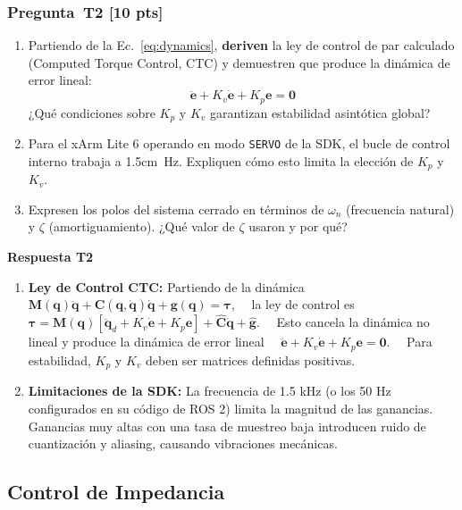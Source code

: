 \documentclass[journal,10pt,twoside]{IEEEtran}
\newcommand{\answerline}[1][3cm]{\underline{\hspace{#1}}}
\newcommand{\pts}[1]{\textbf{\color{tec_red}[#1 pts]}}
\begin{document}
\subsubsection*{Pregunta~T2 \pts{10}}
\begin{enumerate}[label=(\alph*)]
  \item Partiendo de la Ec.~\eqref{eq:dynamics}, \textbf{deriven} la
        ley de control de par calculado (Computed Torque Control, CTC)
        y demuestren que produce la dinámica de error lineal:
        \[
          \ddot{\bm{e}} + K_v\dot{\bm{e}} + K_p\bm{e} = \bm{0}
        \]
        ¿Qué condiciones sobre $K_p$ y $K_v$ garantizan
        estabilidad asintótica global?
  \item Para el xArm Lite 6 operando en modo \texttt{SERVO} de
        la SDK, el bucle de control interno trabaja a \answerline{1.5cm}~Hz.
        Expliquen cómo esto limita la elección de $K_p$ y $K_v$.
  \item Expresen los polos del sistema cerrado en términos de
        $\omega_n$ (frecuencia natural) y $\zeta$ (amortiguamiento).
        ¿Qué valor de $\zeta$ usaron y por qué?
\end{enumerate}
\textbf{Respuesta T2}

\begin{enumerate}[label=(\alph*)]
  \item \textbf{Ley de Control CTC:} Partiendo de la dinámica
  \
  \
  $\bm{M}(\bm{q})\ddot{\bm{q}} + \bm{C}(\bm{q},\dot{\bm{q}})\dot{\bm{q}} + \bm{g}(\bm{q}) = \bm{\tau}$,
  \
  \
  la ley de control es
  \
  \
  $\bm{\tau} = \bm{M}(\bm{q})[\ddot{\bm{q}}_d + K_v\dot{\bm{e}} + K_p\bm{e}] + \hat{\bm{C}}\dot{\bm{q}} + \hat{\bm{g}}$.
  \
  \
  Esto cancela la dinámica no lineal y produce la dinámica de error lineal
  \
  \
  $\ddot{\bm{e}} + K_v\dot{\bm{e}} + K_p\bm{e} = \bm{0}$.
  \
  \
  Para estabilidad, $K_p$ y $K_v$ deben ser matrices definidas positivas.

  \item \textbf{Limitaciones de la SDK:} La frecuencia de 1.5 kHz (o los 50 Hz configurados en su código de ROS 2) limita la magnitud de las ganancias. Ganancias muy altas con una tasa de muestreo baja introducen ruido de cuantización y aliasing, causando vibraciones mecánicas.
\end{enumerate}
\subsection{Control de Impedancia}
\end{document}
